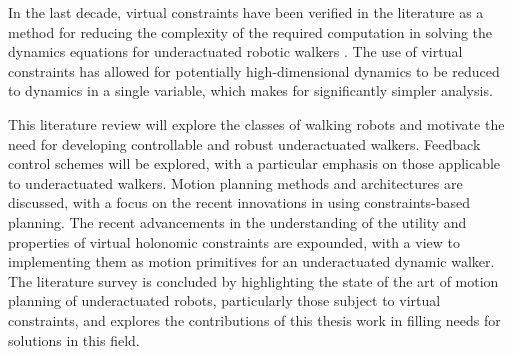 In the last decade, virtual constraints have been verified in the literature as a method for reducing the complexity of the required computation in solving the dynamics equations for underactuated robotic walkers \cite{westervelt2003hybrid, shiriaev2005constructive, shih2007asymptotically}. The use of virtual constraints has allowed for potentially high-dimensional dynamics to be reduced to dynamics in a single variable, which makes for significantly simpler analysis.

This literature review will explore the classes of walking robots and motivate the need for developing controllable and robust underactuated walkers. Feedback control schemes will be explored, with a particular emphasis on those applicable to underactuated walkers. Motion planning methods and architectures are discussed, with a focus on the recent innovations in using constraints-based planning. The recent advancements in the understanding of the utility and properties of virtual holonomic constraints are expounded, with a view to implementing them as motion primitives for an underactuated dynamic walker. The literature survey is concluded by highlighting the state of the art of motion planning of underactuated robots, particularly those subject to virtual constraints, and explores the contributions of this thesis work in filling needs for solutions in this field.